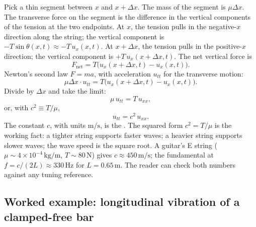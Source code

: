 Pick a thin segment between $x$ and $x + \Delta x$. The mass of
the segment is $\mu \Delta x$. The transverse force on the segment
is the difference in the vertical components of the tension at
the two endpoints. At $x$, the tension pulls in the negative-$x$
direction along the string; the vertical component is $-T \sin
\theta(x, t) \approx -T \, u_{x}(x, t)$. At $x + \Delta x$, the
tension pulls in the positive-$x$ direction; the vertical
component is $+T \, u_{x}(x + \Delta x, t)$. The net vertical
force is
\[
F_{\text{net}} = T\bigl(u_{x}(x + \Delta x, t) - u_{x}(x, t)\bigr).
\]
Newton's second law $F = m a$, with acceleration $u_{tt}$ for the
transverse motion:
\[
\mu \Delta x \cdot u_{tt} = T\bigl(u_{x}(x + \Delta x, t) - u_{x}(x, t)\bigr).
\]
Divide by $\Delta x$ and take the limit:
\[
\mu \, u_{tt} = T\, u_{xx},
\]
or, with $c^{2} \equiv T/\mu$,
\[
\boxed{u_{tt} = c^{2}\, u_{xx}.}
\]
The constant $c$, with units $\si{\meter\per\second}$, is the
. The squared form $c^{2} = T/\mu$ is the
working fact: a tighter string supports faster waves; a heavier
string supports slower waves; the wave speed is the square root.
A guitar's E string ($\mu \sim 4 \times 10^{-4}\,\si{\kilogram\per
\meter}$, $T \sim 80\,\si{\newton}$) gives $c \approx 450\,\si
{\meter\per\second}$; the fundamental at $f = c/(2L) \approx
330\,\si{\hertz}$ for $L = 0.65\,\si{\meter}$. The reader can
check both numbers against any tuning reference.

\subsection{Worked example: longitudinal vibration of a clamped-free bar}

